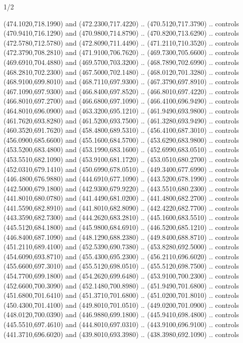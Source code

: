 \begin{flagdescription}{1/2}
\begin{scope}[xshift=0.5\flaglength]
\begin{scope}[scale=0.00745\flagwidth,xshift=-12.1mm,yshift=41.7mm]
\begin{scope}[y=0.80pt, x=0.80pt, yscale=-1, xscale=1, inner sep=0pt, outer sep=0pt]
\begin{scope}[cm={{1.33333,0.0,0.0,-1.33333,(0.0,114.66667)}}]
\begin{scope}[scale=0.100]
  (474.1020,718.1990) and (472.2300,717.4220) .. (470.5120,717.3790) .. controls
  (470.9410,716.1290) and (470.9800,714.8790) .. (470.8200,713.6290) .. controls
  (472.5780,712.5780) and (472.8090,711.4490) .. (471.2110,710.3520) .. controls
  (472.3790,708.2810) and (471.9100,706.7620) .. (469.7300,705.6600) .. controls
  (469.6910,704.4880) and (469.5700,703.3200) .. (468.7890,702.6990) .. controls
  (468.2810,702.2300) and (467.5000,702.1480) .. (468.0120,701.3280) .. controls
  (468.9100,699.8010) and (468.7110,697.9300) .. (467.3790,697.8910) .. controls
  (467.1090,697.9300) and (466.8400,697.8520) .. (466.8010,697.4220) .. controls
  (466.8010,697.2700) and (466.6800,697.1090) .. (466.4100,696.9490) .. controls
  (464.8010,696.0900) and (463.3200,695.1210) .. (461.9490,693.9800) .. controls
  (461.7620,693.8280) and (461.5200,693.7500) .. (461.3280,693.9490) .. controls
  (460.3520,691.7620) and (458.4800,689.5310) .. (456.4100,687.3010) .. controls
  (456.0900,685.6600) and (455.1600,684.5700) .. (453.6290,683.9800) .. controls
  (453.5200,683.4800) and (453.1990,683.1600) .. (452.6990,683.0510) .. controls
  (453.5510,682.1090) and (453.9100,681.1720) .. (453.0510,680.2700) .. controls
  (452.0310,679.1410) and (450.6990,678.0510) .. (449.3400,677.6990) .. controls
  (446.4800,676.9880) and (444.6910,677.1090) .. (443.5200,678.1990) .. controls
  (442.5000,679.1800) and (442.9300,679.9220) .. (443.5510,680.2300) .. controls
  (441.8010,680.0780) and (441.4490,681.0200) .. (441.4800,682.2700) .. controls
  (441.5590,682.8910) and (441.8010,682.8090) .. (442.4220,682.7700) .. controls
  (443.3590,682.7300) and (444.2620,683.2810) .. (445.1600,683.5510) .. controls
  (445.5120,684.1800) and (445.9800,684.6910) .. (446.5200,685.1210) .. controls
  (446.8400,687.1090) and (448.1290,688.2380) .. (449.8400,688.8710) .. controls
  (451.2110,689.4100) and (452.5390,690.7380) .. (453.8280,692.5000) .. controls
  (454.6090,693.8710) and (455.4300,695.2300) .. (456.2110,696.6020) .. controls
  (455.6600,697.3010) and (455.5120,698.0510) .. (455.5120,698.7500) .. controls
  (454.7700,699.1800) and (454.2620,699.6480) .. (453.9100,700.2300) .. controls
  (452.6600,700.3090) and (452.1480,700.8980) .. (451.9490,701.6800) .. controls
  (451.6800,701.6410) and (451.3710,701.6800) .. (451.0200,701.8010) .. controls
  (450.4300,701.4100) and (449.8010,701.0510) .. (449.0200,701.0900) .. controls
  (448.0120,700.0390) and (446.9880,699.1800) .. (445.9410,698.4800) .. controls
  (445.5510,697.4610) and (444.8010,697.0310) .. (443.9100,696.9100) .. controls
  (441.3710,696.6020) and (439.8010,693.3980) .. (438.3980,692.1090) .. controls

\end{scope}
\end{scope}
\end{scope}
\end{scope}
\end{scope}
\end{flagdescription}
